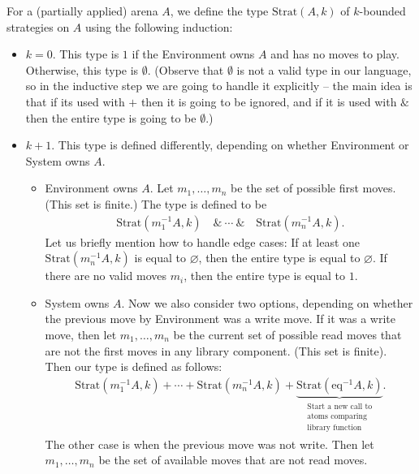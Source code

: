 \documentclass[10pt,a4paper]{amsart}
\numberwithin{equation}{section}
\theoremstyle{plain}
\newcommand{\Strat}{\text{Strat}}
\begin{document}
\begin{definition}
    For a (partially applied) arena $A$, we define the type $\Strat(A, k)$ of $k$-bounded strategies on $A$ using the following induction:
\begin{itemize}
    \item $k=0$. This type is $1$ if the Environment owns $A$ and has no moves to play. Otherwise, this type is $\emptyset$.
          (Observe that $\emptyset$ is not a valid type in our language, so in the inductive step we are going to handle it explicitly --
          the main idea is that if its used with $+$ then it is going to be ignored,
          and if it is used with $\&$ then the entire type is going to be $\emptyset$.) 
    \item $k + 1$. This type is defined differently, depending on whether Environment or System owns $A$.
    \begin{itemize}
        \item Environment owns $A$. Let $m_1,\ldots,m_n$ be the set of possible first moves. (This set is finite.) The type is defined to be 
        \begin{align*}
            \Strat(m_1^{-1}A, k) \quad \&\  \cdots\  \& \quad  \Strat(m_n^{-1}A, k).
        \end{align*}
        Let us briefly mention how to handle edge cases: If at least one $\Strat(m_n^{-1}A, k)$ is equal to $\varnothing$, then 
        the entire type is equal to $\varnothing$. If there are no valid moves $m_i$, then the entire type is equal to $1$. 
        \item System owns $A$. Now we also consider two options, depending on whether the previous move by Environment was a write move. 
               If it was a write move, then let $m_1, \ldots, m_n$ be the current set of possible read moves that are not the first moves in any library 
               component. (This set is finite). Then our type is defined as follows:
               \begin{align*}
                \Strat(m_1^{-1}A, k) + \cdots + \Strat(m_n^{-1}A, k) + \underbrace{\Strat({\text{eq}}^{-1}A, k)}_{\substack{\textrm{Start a new call to}\\
                \textrm{atoms comparing}\\
                \textrm{library function}}}.
               \end{align*}
               The other case is when the previous move was not write. Then let $m_1, \ldots, m_n$ be the set of available moves that are not read moves. 

\end{itemize}
\end{itemize}
\end{definition}
\end{document}
